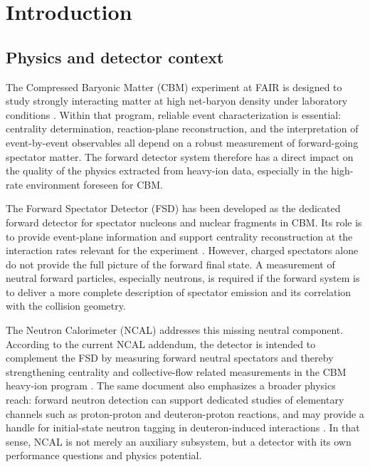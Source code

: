 \chapter{Introduction}

\section{Physics and detector context}

The Compressed Baryonic Matter (CBM) experiment at FAIR is designed to study strongly interacting matter at high net-baryon density under laboratory conditions \citep{Friman2011CBMPhysicsBook}. Within that program, reliable event characterization is essential: centrality determination, reaction-plane reconstruction, and the interpretation of event-by-event observables all depend on a robust measurement of forward-going spectator matter. The forward detector system therefore has a direct impact on the quality of the physics extracted from heavy-ion data, especially in the high-rate environment foreseen for CBM.

The Forward Spectator Detector (FSD) has been developed as the dedicated forward detector for spectator nucleons and nuclear fragments in CBM. Its role is to provide event-plane information and support centrality reconstruction at the interaction rates relevant for the experiment \citep{Dvorak2025FSD}. However, charged spectators alone do not provide the full picture of the forward final state. A measurement of neutral forward particles, especially neutrons, is required if the forward system is to deliver a more complete description of spectator emission and its correlation with the collision geometry.

The Neutron Calorimeter (NCAL) addresses this missing neutral component. According to the current NCAL addendum, the detector is intended to complement the FSD by measuring forward neutral spectators and thereby strengthening centrality and collective-flow related measurements in the CBM heavy-ion program \citep{Okropiridze2026NCALAddendum}. The same document also emphasizes a broader physics reach: forward neutron detection can support dedicated studies of elementary channels such as proton-proton and deuteron-proton reactions, and may provide a handle for initial-state neutron tagging in deuteron-induced interactions \citep{Okropiridze2026NCALAddendum}. In that sense, NCAL is not merely an auxiliary subsystem, but a detector with its own performance questions and physics potential.


